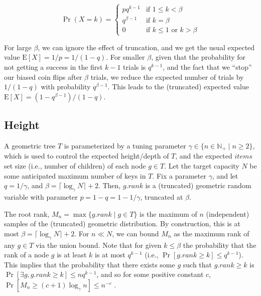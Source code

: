 \documentclass{article}
\begin{document}

$$
    \Pr(X = k) =
    \begin{cases}
        pq^{k-1}    & \text{if } 1 \leq k < \beta               \\
        q^{\beta-1} & \text{if } k = \beta                      \\
        0           & \text{if } k \leq 1 \text{ or } k > \beta
    \end{cases}
$$

For large $\beta$, we can ignore the effect of truncation, and we get the usual expected value $\text{E}[X] = 1/p = 1/(1 - q)$. For smaller $\beta$, given that the probability for not getting a success in the first $k-1$ trials is $q^{k-1}$, and the fact that we ``stop'' our biased coin flips after $\beta$ trials, we reduce the expected number of trials by $1/(1-q)$ with probability $q^{\beta-1}$. This leads to the (truncated) expected value $\text{E}[X] = (1 - q^{\beta-1})/(1 - q)$.

\subsection{Height}

A geometric tree $T$ is parameterized by a tuning parameter $\gamma \in \{n \in \mathbb{N}_+ \mid n \ge 2\}$, which is used to control the expected height/depth of $T$, and the expected $items$ set size (i.e., number of children) of each node $g \in T$. Let the target capacity $N$ be some anticipated maximum number of keys in $T$. Fix a parameter $\gamma$, and let $q = 1/\gamma$, and $\beta = \lceil\log_\gamma N\rceil + 2$. Then, $g.rank$ is a (truncated) geometric random variable with parameter $p = 1 - q = 1 - 1/\gamma$, truncated at $\beta$.

The root rank, $M_n = \max\{g.rank \mid g \in T\}$ is the maximum of $n$ (independent) samples of the (truncated) geometric distribution. By construction, this is at most $\beta = \lceil\log_\gamma N\rceil + 2$. For $n \ll N$, we can bound $M_n$ as the maximum rank of any $g \in T$ via the union bound.
Note that for given $k \le \beta$ the probability that the rank of a node $g$ is at least $k$ is at most $q^{k-1}$ (i.e., $\Pr[g.rank \ge k] \le q^{k-1}$). This implies that the probability that there exists some $g$ such that $g.rank \ge k$ is $\Pr[\exists g, g.rank \ge k] \le n q^{k-1}$, and so for some positive constant $c$, $\Pr[M_n \ge (c + 1) \log_\gamma n] \le n^{-c}$ \cite{golovin2010b}.
\end{document}
